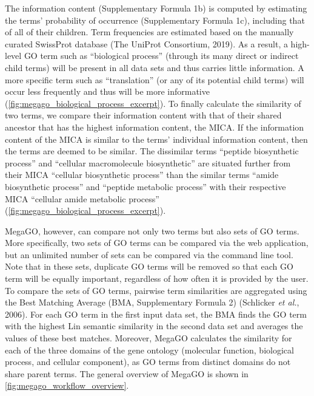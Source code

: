 The information content (Supplementary Formula 1b) is computed by
estimating the terms' probability of occurrence (Supplementary Formula
1c), including that of all of their children. Term frequencies are
estimated based on the manually curated SwissProt database (The UniProt
Consortium, 2019). As a result, a high-level GO term such as
``biological process'' (through its many direct or indirect child terms)
will be present in all data sets and thus carries little information. A
more specific term such as ``translation'' (or any of its potential
child terms) will occur less frequently and thus will be more
informative (\autoref{fig:megago_biological_process_excerpt}). To
finally calculate the similarity of two terms, we compare their
information content with that of their shared ancestor that has the
highest information content, the MICA. If the information content of the
MICA is similar to the terms' individual information content, then the
terms are deemed to be similar. The dissimilar terms ``peptide
biosynthetic process'' and ``cellular macromolecule biosynthetic'' are
situated further from their MICA ``cellular biosynthetic process'' than
the similar terms ``amide biosynthetic process'' and ``peptide metabolic
process'' with their respective MICA ``cellular amide metabolic
process'' (\autoref{fig:megago_biological_process_excerpt}).

MegaGO, however, can compare not only two terms but also sets of GO
terms. More specifically, two sets of GO terms can be compared via the
web application, but an unlimited number of sets can be compared via the
command line tool. Note that in these sets, duplicate GO terms will be
removed so that each GO term will be equally important, regardless of
how often it is provided by the user. To compare the sets of GO terms,
pairwise term similarities are aggregated using the Best Matching
Average (BMA, Supplementary Formula 2) (Schlicker \emph{et al.}, 2006).
For each GO term in the first input data set, the BMA finds the GO term
with the highest Lin semantic similarity in the second data set and
averages the values of these best matches. Moreover, MegaGO calculates
the similarity for each of the three domains of the gene ontology
(molecular function, biological process, and cellular component), as GO
terms from distinct domains do not share parent terms. The general
overview of MegaGO is shown in \autoref{fig:megago_workflow_overview}.


